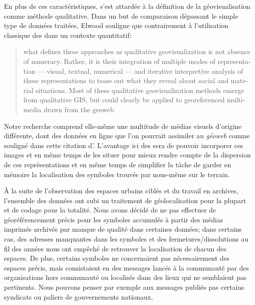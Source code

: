 En plus de ces caractéristiques, \citet{Elwood2011} s'est attardée à la définition de la géovisualisation comme méthode qualitative.
Dans un but de comparaison dépassant le simple type de données traitées, Elwood souligne que contrairement à l'utilisation classique des \sig{} dans un contexte quantitatif: \foreignblockquote{english}[{\cite{Elwood2011}}][.]{\textelp{} what defines these approaches as qualitative geovisualization is not absence of numeracy.
 Rather, it is their integration of multiple modes of representation –-- visual, textual, numerical --– and iterative interpretive analysis of these representations to tease out what they reveal about social and material situations.
Most of these qualitative geovisualization methods emerge from qualitative GIS, but could clearly be applied to georeferenced multimedia drawn from the geoweb}.
Notre recherche comprend elle-même une multitude de médias visuels d'origine différente, dont des données en ligne que l'on pourrait assimiler au \emph{géoweb} comme souligné dans cette citation d'\citeauthor{Elwood2011}.
L'avantage ici des \sig{} sera de pouvoir incorporer ces images et en même temps de les situer pour mieux rendre compte de la dispersion de ces représentations et en même temps de simplifier la tâche de garder en mémoire la localisation des symboles trouvés par nous-même sur le terrain.

À la suite de l'observation des espaces urbains ciblés et du travail en archives, l'ensemble des données ont subi un traitement de géolocalisation pour la plupart et de codage pour la totalité.
Nous avons décidé de ne pas effectuer de géoréférencement précis pour les symboles accumulés à partir des médias imprimés archivés par manque de qualité dans certaines données; dans certains cas, des adresses manquantes dans les symboles et des fermetures/dissolutions au fil des années nous ont empêché de retrouver la localisation de chacun des espaces.
De plus, certains symboles ne concernaient pas nécessairement des espaces précis, mais consistaient en des messages lancés à la communauté par des organisations hors communauté ou localisés dans des lieux qui ne semblaient pas  pertinents.
Nous pouvons penser par exemple aux messages publiés pas certains syndicats ou paliers de gouvernements nationaux.

